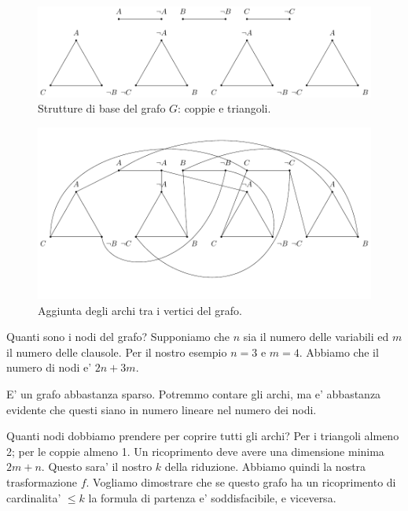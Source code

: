 \begin{figure}[h]
    \begin{center}
        \includegraphics[scale=0.75]{./img/NPClass/SATtoVC1.pdf}
        \caption{Strutture di base del grafo $G$: coppie e triangoli.}
        \label{img:SATtoVC1}
    \end{center}
\end{figure}

\begin{figure}[h]
    \begin{center}
        \includegraphics[scale=0.75]{./img/NPClass/SATtoVC2.pdf}
        \caption{Aggiunta degli archi tra i vertici del grafo.}
        \label{img:SATtoVC2}
    \end{center}
\end{figure}

Quanti sono i nodi del grafo? Supponiamo che $n$ sia il numero delle variabili ed $m$ il numero
delle clausole. Per il nostro esempio $n=3$ e $m=4$. Abbiamo che il numero di nodi e' $2n + 3m$.

E' un grafo abbastanza sparso. Potremmo contare gli archi, ma e' abbastanza evidente che questi
siano in numero lineare nel numero dei nodi.

Quanti nodi dobbiamo prendere per coprire tutti gli archi? Per i triangoli almeno 2; per le coppie
almeno 1. Un ricoprimento deve avere una dimensione minima $2m + n$. Questo sara' il nostro $k$
della riduzione. Abbiamo quindi la nostra trasformazione $f$. Vogliamo dimostrare che se questo
grafo ha un ricoprimento di cardinalita' $\leq k$ la formula di partenza e' soddisfacibile, e
viceversa.

